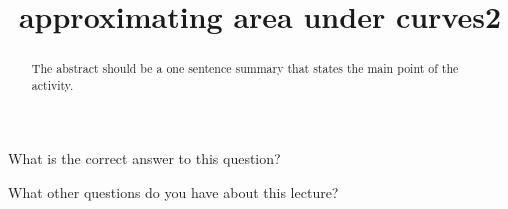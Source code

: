 \documentclass{ximera}
\title{approximating area under curves2}
\begin{document}
\begin{abstract}
  The abstract should be a one sentence summary that states the main point of the activity.
\end{abstract}

\maketitle

\begin{question}
  What is the correct answer to this question?

  \begin{solution}
    \begin{multiple-choice}
    \end{multiple-choice}  
  \end{solution}
\end{question}

What other questions do you have about this lecture?
\begin{free-response}
\end{free-response}
\end{document}
